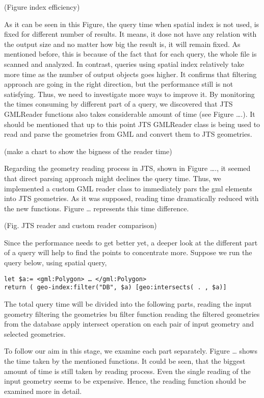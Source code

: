 (Figure index efficiency)

As it can be seen in this Figure, the query time when spatial index is not used, is fixed for different number of results. It means, it dose not have any relation with the output size and no matter how big the result is, it will remain fixed. As mentioned before, this is because of the fact that for each query, the whole file is scanned and analyzed. In contrast, queries using spatial index relatively take more time as the number of output objects goes higher. It confirms that filtering approach are going in the right direction, but the performance still is not satisfying. Thus, we need to investigate more ways to improve it.
By monitoring the times consuming by different part of a query, we discovered that JTS GMLReader functions also takes considerable amount of time (see Figure ….). It should be mentioned that up to this point JTS GMLReader class is being used to read and parse the geometries from GML and convert them to JTS geometries.  

(make a chart to show the bigness of the reader time)

Regarding the geometry reading process in JTS, shown in Figure …., it seemed that direct parsing approach might declines the query time. Thus, we implemented a custom GML reader class to immediately pars the gml elements into JTS geometries. As it was supposed, reading time dramatically reduced with the new functions. Figure … represents this time difference.

 (Fig. JTS reader and custom reader comparison)

Since the performance needs to get better yet, a deeper look at the different part of a query will help to find the points to concentrate more. Suppose we run the query below, using spatial query,
\begin{verbatim}
let $a:= <gml:Polygon> … </gml:Polygon>
return ( geo-index:filter("DB", $a) [geo:intersects( . , $a)]
\end{verbatim}
The total query time will be divided into the following parts,
reading the input geometry
filtering the geometries bu filter function 
reading the filtered geometries from the database
apply intersect operation on each pair of input geometry and selected geometries.

To follow our aim in this stage, we examine each part separately. Figure … shows the time taken by the mentioned functions. It could be seen, that the biggest amount of time is still taken by reading process. Even the single reading of the input geometry seems to be expensive. Hence, the reading function should be examined more in detail.

